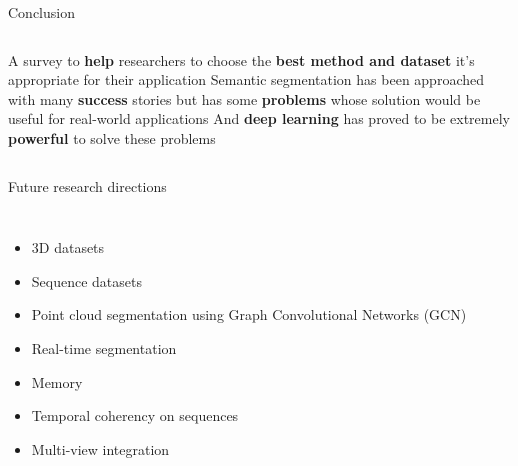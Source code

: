 \begin{frame}[t]{Conclusion} 
    \begin{columns}[c]
            \newline
            \newline
                A survey to \textbf{help} researchers to choose the \textbf{best method and dataset} it's appropriate for their application
            \newline
            \newline
                Semantic segmentation has been approached with many \textbf{success} stories but has some \textbf{problems} whose solution would be useful for real-world applications
            \newline
            \newline
                And \textbf{deep learning} has proved to be extremely \textbf{powerful} to solve these problems
           
        
    \end{columns}
    
\end{frame}

\begin{frame}[t]{Future research directions} 
    \begin{columns}[c]
        \begin{itemize}
                \item 3D datasets
                \item Sequence datasets
                \item Point cloud segmentation using  Graph Convolutional Networks (GCN) 
                \item Real-time segmentation
                \item Memory
                \item Temporal coherency on sequences
                \item Multi-view integration 
          
        \end{itemize}
                 
       
    \end{columns}
    
\end{frame}
